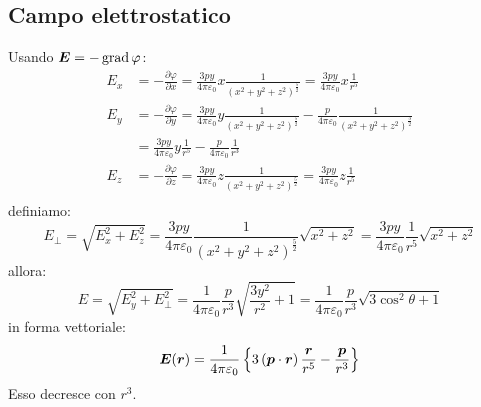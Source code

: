 \subsection{Campo elettrostatico}
Usando $\boldsymbol{E}=-\operatorname{grad}\varphi$:
\begin{align*}
E_x&=-\frac{\partial\varphi}{\partial x}=\frac{3py}{4\pi\varepsilon_0}x\frac{1}{\left(x^2+y^2+z^2\right)^\frac{5}{2}}=\frac{3py}{4\pi\varepsilon_0}x\frac{1}{r^5}\\
E_y&=-\frac{\partial\varphi}{\partial y}=\frac{3py}{4\pi\varepsilon_0}y\frac{1}{\left(x^2+y^2+z^2\right)^\frac{5}{2}}-\frac{p}{4\pi\varepsilon_0}\frac{1}{\left(x^2+y^2+z^2\right)^\frac{3}{2}}\\
&=\frac{3py}{4\pi\varepsilon_0}y\frac{1}{r^5}-\frac{p}{4\pi\varepsilon_0}\frac{1}{r^3}\\
E_z&=-\frac{\partial\varphi}{\partial z}=\frac{3py}{4\pi\varepsilon_0}z\frac{1}{\left(x^2+y^2+z^2\right)^\frac{5}{2}}=\frac{3py}{4\pi\varepsilon_0}z\frac{1}{r^5}\\
\end{align*}
definiamo:
\begin{equation*}E_\perp=\sqrt{E_x^2+E_z^2}=\frac{3py}{4\pi\varepsilon_0}\frac{1}{\left(x^2+y^2+z^2\right)^\frac{5}{2}}\sqrt{x^2+z^2}=\frac{3py}{4\pi\varepsilon_0}\frac{1}{r^{5}}\sqrt{x^2+z^2}\end{equation*}
allora:
\begin{equation*}E=\sqrt{E_y^2+E_\perp^2}=\frac{1}{4\pi\varepsilon_0}\frac{p}{r^3}\sqrt{\frac{3y^2}{r^2}+1}=\frac{1}{4\pi\varepsilon_0}\frac{p}{r^3}\sqrt{3\cos^2\theta+1}\end{equation*}
in forma vettoriale:
\begin{equation}
\label{eq:campo_dipolo}
\boldsymbol{E}(\boldsymbol{r})=\frac{1}{4\pi\varepsilon_0}\left\{3\left(\boldsymbol{p}\cdot\boldsymbol{r}\right)\frac{\boldsymbol{r}}{r^5}-\frac{\boldsymbol{p}}{r^3}\right\}\end{equation}
Esso decresce con $r^3$.
